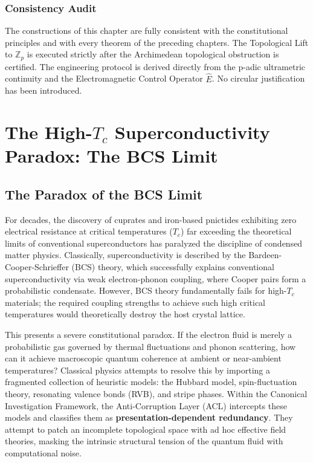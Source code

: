 \documentclass[12pt,twoside]{extbook}
\theoremstyle{definition}
\theoremstyle{remark}
\newcommand{\term}[1]{\textcolor{brandPrimary}{\textbf{#1}}}
\begin{document}
\subsection*{Consistency Audit}
The constructions of this chapter are fully consistent with the constitutional principles and with every theorem of the preceding chapters. The Topological Lift to $\mathbb{Z}_p$ is executed strictly after the Archimedean topological obstruction is certified. The engineering protocol is derived directly from the p-adic ultrametric continuity and the Electromagnetic Control Operator $\hat{E}$. No circular justification has been introduced.

\chapter{The High-$T_c$ Superconductivity Paradox: The BCS Limit}

\section{The Paradox of the BCS Limit}
For decades, the discovery of cuprates and iron-based pnictides exhibiting zero electrical resistance at critical temperatures ($T_c$) far exceeding the theoretical limits of conventional superconductors has paralyzed the discipline of condensed matter physics. Classically, superconductivity is described by the Bardeen-Cooper-Schrieffer (BCS) theory, which successfully explains conventional superconductivity via weak electron-phonon coupling, where Cooper pairs form a probabilistic condensate. However, BCS theory fundamentally fails for high-$T_c$ materials; the required coupling strengths to achieve such high critical temperatures would theoretically destroy the host crystal lattice.

This presents a severe constitutional paradox. If the electron fluid is merely a probabilistic gas governed by thermal fluctuations and phonon scattering, how can it achieve macroscopic quantum coherence at ambient or near-ambient temperatures? Classical physics attempts to resolve this by importing a fragmented collection of heuristic models: the Hubbard model, spin-fluctuation theory, resonating valence bonds (RVB), and stripe phases. Within the Canonical Investigation Framework, the Anti-Corruption Layer (ACL) intercepts these models and classifies them as \term{presentation-dependent redundancy}. They attempt to patch an incomplete topological space with ad hoc effective field theories, masking the intrinsic structural tension of the quantum fluid with computational noise.
\end{document}
